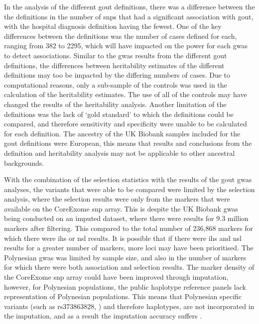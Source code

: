 \documentclass[]{report}
\begin{document}
In the analysis of the different gout definitions, there was a
difference between the the definitions in the number of \glspl{snp} that
had a significant association with gout, with the hospital diagnosis
definition having the fewest. One of the key differences between the
definitions was the number of cases defined for each, ranging from 382
to 2295, which will have impacted on the power for each \gls{gwas} to
detect associations. Similar to the \gls{gwas} results from the
different gout definitions, the differences between heritability
estimates of the different definitions may too be impacted by the
differing numbers of cases. Due to computational reasons, only a
sub-sample of the controls was used in the calculation of the
heritability estimates. The use of all of the controls may have changed
the results of the heritability analysis. Another limitation of the
definitions was the lack of `gold standard' to which the definitions
could be compared, and therefore sensitivity and specificity were unable
to be calculated for each definition. The ancestry of the UK Biobank
samples included for the gout definitions were European, this means that
results and conclusions from the definition and heritability analysis
may not be applicable to other ancestral backgrounds.

With the combination of the selection statistics with the results of the
gout \gls{gwas} analyses, the variants that were able to be compared
were limited by the selection analysis, where the selection results were
only from the markers that were available on the CoreExome \gls{snp}
array. This is despite the UK Biobank \gls{gwas} being conducted on an
imputed dataset, where there were results for 9.3 million markers after
filtering. This compared to the total number of 236,868 markers for
which there were \gls{ihs} or \gls{nsl} results. It is possible that if
there were \gls{ihs} and \gls{nsl} results for a greater number of
markers, more loci may have been prioritised. The Polynesian \gls{gwas}
was limited by sample size, and also in the number of markers for which
there were both association and selection results. The marker density of
the CoreExome \gls{snp} array could have been improved through
imputation, however, for Polynesian populations, the public haplotype
reference panels lack representation of Polynesian populations. This
means that Polynesian specific variants (such as rs373863828,
\citet{Minster2016}) and therefore haplotypes, are not incorporated in
the imputation, and as a result the imputation accuracy suffers
\citep{Howie2011}.
\end{document}
